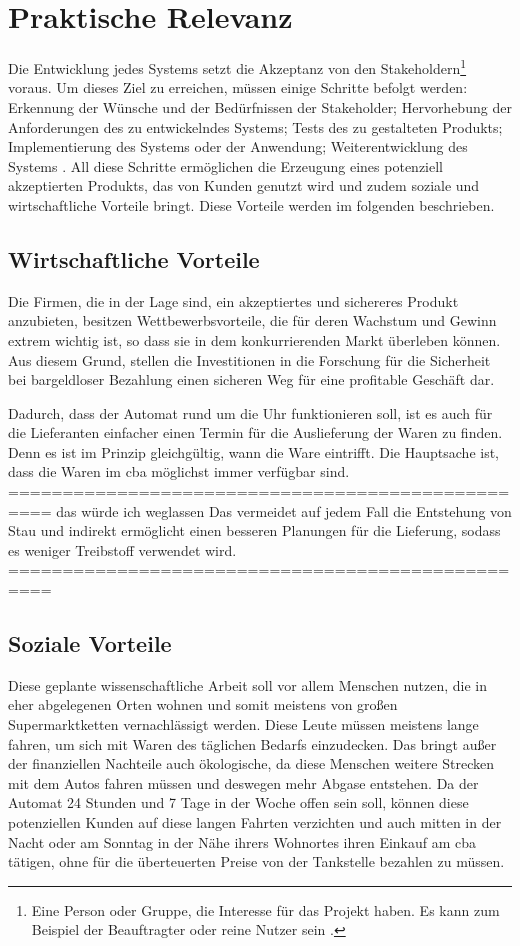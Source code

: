 \section{Praktische Relevanz}

Die Entwicklung jedes Systems setzt die Akzeptanz von den Stakeholdern\footnote{Eine Person oder Gruppe, die Interesse 
für das Projekt haben. Es kann zum Beispiel der Beauftragter oder reine Nutzer sein \cite{refip:HSSI}.} voraus. Um dieses Ziel 
zu erreichen, müssen einige Schritte befolgt werden: Erkennung der Wünsche und der Bedürfnissen der Stakeholder; Hervorhebung 
der Anforderungen des zu entwickelndes Systems; Tests des zu gestalteten Produkts; Implementierung des Systems oder 
der Anwendung; Weiterentwicklung des Systems \cite{refbook:RECR}. All diese Schritte ermöglichen die Erzeugung eines 
potenziell akzeptierten Produkts, das von Kunden genutzt wird und zudem soziale und wirtschaftliche Vorteile bringt.
Diese Vorteile werden im folgenden beschrieben.


\subsection{Wirtschaftliche Vorteile}

Die Firmen, die in der Lage sind, ein akzeptiertes und sichereres Produkt anzubieten, besitzen Wettbewerbsvorteile, 
die für deren Wachstum und Gewinn extrem wichtig ist, so dass sie in dem konkurrierenden Markt überleben können. Aus 
diesem Grund, stellen die Investitionen in die Forschung für die Sicherheit bei bargeldloser Bezahlung einen sicheren 
Weg für eine profitable Geschäft dar.


Dadurch, dass der Automat rund um die Uhr funktionieren soll, ist es auch für die Lieferanten einfacher einen Termin 
für die Auslieferung der Waren zu finden. Denn es ist im Prinzip gleichgültig, wann die Ware eintrifft. Die Hauptsache 
ist, dass die Waren im \acrshort{cba} möglichst immer verfügbar sind. 
================================================== das würde ich weglassen
Das vermeidet auf jedem Fall die Entstehung von 
Stau und indirekt ermöglicht einen besseren Planungen  für die Lieferung, sodass es weniger Treibstoff verwendet wird.
==================================================

\subsection{Soziale Vorteile}

Diese geplante wissenschaftliche Arbeit soll vor allem Menschen nutzen, die in eher abgelegenen Orten wohnen und somit 
meistens von großen Supermarktketten vernachlässigt werden. Diese Leute müssen meistens lange fahren, um sich mit
Waren des täglichen Bedarfs einzudecken. Das bringt außer der finanziellen Nachteile auch ökologische, da diese Menschen weitere Strecken mit dem Autos fahren 
müssen und deswegen mehr Abgase entstehen. Da der Automat 24 Stunden und 7 Tage in der Woche offen sein soll,
können diese potenziellen Kunden auf diese langen Fahrten verzichten und auch mitten in der Nacht oder am Sonntag in der Nähe ihrers Wohnortes
ihren Einkauf am \acrshort{cba} tätigen, ohne für die überteuerten Preise von der Tankstelle bezahlen zu müssen. 


